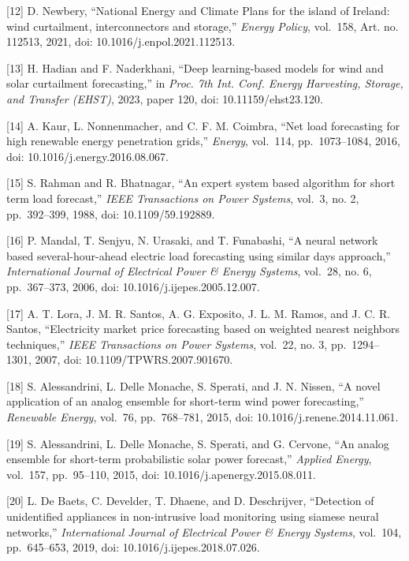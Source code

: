 \documentclass[
  10pt,
  a4paper,
]{article}
\begin{document}
{[}12{]} D. Newbery, ``National Energy and Climate Plans for the island
of Ireland: wind curtailment, interconnectors and storage,''
\emph{Energy Policy}, vol.~158, Art. no. 112513, 2021, doi:
10.1016/j.enpol.2021.112513.

{[}13{]} H. Hadian and F. Naderkhani, ``Deep learning-based models for
wind and solar curtailment forecasting,'' in \emph{Proc. 7th Int. Conf.
Energy Harvesting, Storage, and Transfer (EHST)}, 2023, paper 120, doi:
10.11159/ehst23.120.

{[}14{]} A. Kaur, L. Nonnenmacher, and C. F. M. Coimbra, ``Net load
forecasting for high renewable energy penetration grids,''
\emph{Energy}, vol.~114, pp.~1073--1084, 2016, doi:
10.1016/j.energy.2016.08.067.

{[}15{]} S. Rahman and R. Bhatnagar, ``An expert system based algorithm
for short term load forecast,'' \emph{IEEE Transactions on Power
Systems}, vol.~3, no. 2, pp.~392--399, 1988, doi: 10.1109/59.192889.

{[}16{]} P. Mandal, T. Senjyu, N. Urasaki, and T. Funabashi, ``A neural
network based several-hour-ahead electric load forecasting using similar
days approach,'' \emph{International Journal of Electrical Power \&
Energy Systems}, vol.~28, no. 6, pp.~367--373, 2006, doi:
10.1016/j.ijepes.2005.12.007.

{[}17{]} A. T. Lora, J. M. R. Santos, A. G. Exposito, J. L. M. Ramos,
and J. C. R. Santos, ``Electricity market price forecasting based on
weighted nearest neighbors techniques,'' \emph{IEEE Transactions on
Power Systems}, vol.~22, no. 3, pp.~1294--1301, 2007, doi:
10.1109/TPWRS.2007.901670.

{[}18{]} S. Alessandrini, L. Delle Monache, S. Sperati, and J. N.
Nissen, ``A novel application of an analog ensemble for short-term wind
power forecasting,'' \emph{Renewable Energy}, vol.~76, pp.~768--781,
2015, doi: 10.1016/j.renene.2014.11.061.

{[}19{]} S. Alessandrini, L. Delle Monache, S. Sperati, and G. Cervone,
``An analog ensemble for short-term probabilistic solar power
forecast,'' \emph{Applied Energy}, vol.~157, pp.~95--110, 2015, doi:
10.1016/j.apenergy.2015.08.011.

{[}20{]} L. De Baets, C. Develder, T. Dhaene, and D. Deschrijver,
``Detection of unidentified appliances in non-intrusive load monitoring
using siamese neural networks,'' \emph{International Journal of
Electrical Power \& Energy Systems}, vol.~104, pp.~645--653, 2019, doi:
10.1016/j.ijepes.2018.07.026.
\end{document}
